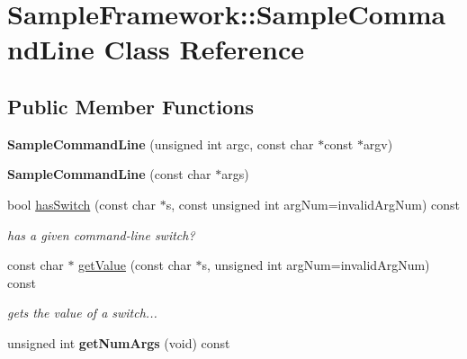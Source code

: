\hypertarget{classSampleFramework_1_1SampleCommandLine}{
\section{SampleFramework::SampleCommandLine Class Reference}
\label{classSampleFramework_1_1SampleCommandLine}
}
\subsection*{Public Member Functions}
\begin{DoxyCompactItemize}
\item 
\hypertarget{classSampleFramework_1_1SampleCommandLine_a76622b643b29cdb5c3370acb91a30601}{
{\bfseries SampleCommandLine} (unsigned int argc, const char $\ast$const $\ast$argv)}
\label{classSampleFramework_1_1SampleCommandLine_a76622b643b29cdb5c3370acb91a30601}

\item 
\hypertarget{classSampleFramework_1_1SampleCommandLine_a0fcd0882db5e0543fd4eb3d75b4f2af0}{
{\bfseries SampleCommandLine} (const char $\ast$args)}
\label{classSampleFramework_1_1SampleCommandLine_a0fcd0882db5e0543fd4eb3d75b4f2af0}

\item 
\hypertarget{classSampleFramework_1_1SampleCommandLine_aa6a8a5ed079146456eea02d20bfde16d}{
bool \hyperlink{classSampleFramework_1_1SampleCommandLine_aa6a8a5ed079146456eea02d20bfde16d}{hasSwitch} (const char $\ast$s, const unsigned int argNum=invalidArgNum) const }
\label{classSampleFramework_1_1SampleCommandLine_aa6a8a5ed079146456eea02d20bfde16d}

\begin{DoxyCompactList}\small\item\em has a given command-\/line switch? \item\end{DoxyCompactList}\item 
\hypertarget{classSampleFramework_1_1SampleCommandLine_a89633df2d82ba7d9875352a753724559}{
const char $\ast$ \hyperlink{classSampleFramework_1_1SampleCommandLine_a89633df2d82ba7d9875352a753724559}{getValue} (const char $\ast$s, unsigned int argNum=invalidArgNum) const }
\label{classSampleFramework_1_1SampleCommandLine_a89633df2d82ba7d9875352a753724559}

\begin{DoxyCompactList}\small\item\em gets the value of a switch... \item\end{DoxyCompactList}\item 
\hypertarget{classSampleFramework_1_1SampleCommandLine_a256aa8da0daefbbf86b2a0a6626b3c81}{
unsigned int {\bfseries getNumArgs} (void) const }
\label{classSampleFramework_1_1SampleCommandLine_a256aa8da0daefbbf86b2a0a6626b3c81}


\end{DoxyCompactItemize}
